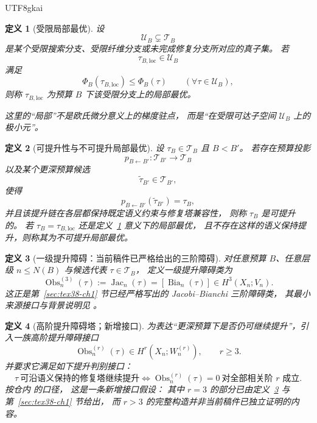 \documentclass[12pt]{article}
\newtheorem{definition}{定义}[section]
\newcommand{\Bia}{\operatorname{Bia}}
\newcommand{\Jac}{\operatorname{Jac}}
\newcommand{\Obs}{\operatorname{Obs}}
\begin{document}
\begin{CJK*}{UTF8}{gkai}
\begin{definition}[受限局部最优]
\label{def:tex38-budget-local-opt}
设
\[
  \mathcal U_B\subsetneq \mathcal T_B
\]
是某个受限搜索分支、受限纤维分支或未完成修复分支所对应的真子集。
若
\[
  \tau_{B,\mathrm{loc}}\in\mathcal U_B
\]
满足
\[
  \Phi_B(\tau_{B,\mathrm{loc}})
  \le
  \Phi_B(\tau)
  \qquad
  (\forall \tau\in\mathcal U_B),
\]
则称 $\tau_{B,\mathrm{loc}}$ 为预算 $B$ 下该受限分支上的\emph{局部最优}。

这里的“局部”不是欧氏微分意义上的梯度驻点，
而是“在受限可达子空间 $\mathcal U_B$ 上的极小元”。
\end{definition}

\begin{definition}[可提升性与不可提升局部最优]
\label{def:tex38-liftability}
设 $\tau_B\in\mathcal T_B$ 且 $B<B'$。
若存在预算投影
\[
  p_{B\leftarrow B'}:\mathcal T_{B'}\to\mathcal T_B
\]
以及某个更深预算候选
\[
  \widetilde\tau_{B'}\in\mathcal T_{B'},
\]
使得
\[
  p_{B\leftarrow B'}(\widetilde\tau_{B'})=\tau_B,
\]
并且该提升链在各层都保持既定语义约束与修复塔兼容性，
则称 $\tau_B$ 是\emph{可提升}的。
若 $\tau_B=\tau_{B,\mathrm{loc}}$ 还是定义~\ref{def:tex38-budget-local-opt} 意义下的局部最优，
且不存在这样的语义保持提升，则称其为\emph{不可提升局部最优}。
\end{definition}

\begin{definition}[一级提升障碍：当前稿件已严格给出的三阶障碍]
\label{def:tex38-first-obstruction}
对任意预算 $B$、任意层级 $n\le N(B)$ 与候选代表 $\tau\in\mathcal T_B$，
定义一级提升障碍类为
\[
  \Obs^{(3)}_n(\tau)
  :=
  \Jac_n(\tau)
  =
  [\Bia_n(\tau)]
  \in H^3(X_n;V_n).
\]
这正是第~\ref{sec:tex38-ch1} 节已经严格写出的 Jacobi--Bianchi 三阶障碍类，
其最小来源接口与背景说明见 \cite{RepoTex6JacobiGap,GaoZheng2025GFramework}。
\end{definition}

\begin{definition}[高阶提升障碍塔；新增接口]
\label{def:tex38-higher-obstruction}
为表达“更深预算下是否仍可继续提升”，引入一族高阶提升障碍接口
\[
  \Obs^{(r)}_n(\tau)\in H^r(X_n;W_n^{(r)}),
  \qquad
  r\ge 3.
\]
并要求它满足如下提升判别接口：
\[
  \tau\ \text{可沿语义保持的修复塔继续提升}
  \iff
  \Obs^{(r)}_n(\tau)=0\ \text{对全部相关阶 }r\text{ 成立}.
\]
按仓内 \cite{RepoTex22DiscussionGains,RepoTex29TransfiniteRepair,RepoTex32ConditionalConvergence} 的口径，
这是一条\emph{新增接口假设}：
其中 $r=3$ 的部分已由定义~\ref{def:tex38-first-obstruction} 与第~\ref{sec:tex38-ch1} 节给出，
而 $r>3$ 的完整构造并非当前稿件已独立证明的内容。
\end{definition}


\end{CJK*}
\end{document}
